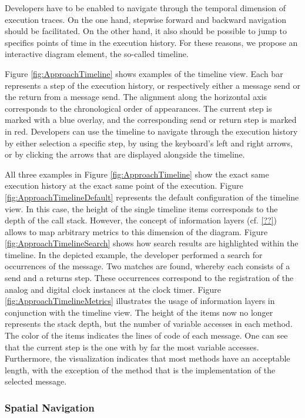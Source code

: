 Developers have to be enabled to navigate through the temporal dimension of execution traces.
On the one hand, stepwise forward and backward navigation should be facilitated.
On the other hand, it also should be possible to jump to specifics points of time in the execution history.
For these reasons, we propose an interactive diagram element, the so-called timeline.

Figure \ref{fig:ApproachTimeline} shows examples of the timeline view.
Each bar represents a step of the execution history, or respectively either a message send or the return from a message send.
The alignment along the horizontal axis corresponds to the chronological order of appearances.
The current step is marked with a blue overlay, and the corresponding send or return step is marked in red.
Developers can use the timeline to navigate through the execution history by either selection a specific step, by using the keyboard's left and right arrows, or by clicking the arrows that are displayed alongside the timeline.

All three examples in Figure \ref{fig:ApproachTimeline} show the exact same execution history at the exact same point of the execution.
Figure \ref{fig:ApproachTimelineDefault} represents the default configuration of the timeline view.
In this case, the height of the single timeline items corresponds to the depth of the call stack.
However, the concept of information layers (cf. \ref{??}) allows to map arbitrary metrics to this dimension of the diagram.
Figure \ref{fig:ApproachTimelineSearch} shows how search results are highlighted within the timeline.
In the depicted example, the developer performed a search for occurrences of the  message.
Two matches are found, whereby each consists of a send and a returns step.
These occurrences correspond to the registration of the analog and digital clock instances at the clock timer.
Figure \ref{fig:ApproachTimelineMetrics} illustrates the usage of information layers in conjunction with the timeline view.
The height of the items now no longer represents the stack depth, but the number of variable accesses in each method.
The color of the items indicates the lines of code of each message.
One can see that the current step is the one with by far the most variable accesses.
Furthermore, the visualization indicates that most methods have an acceptable length, with the exception of the method that is the implementation of the selected message.

\subsubsection{Spatial Navigation}

